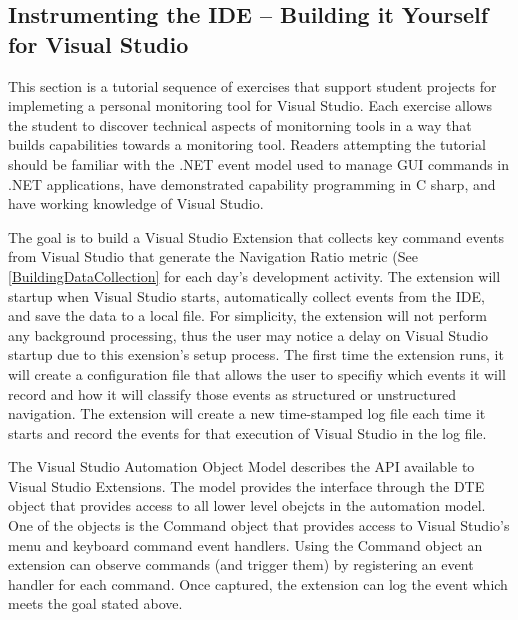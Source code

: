 
\subsection{Instrumenting the IDE -- Building it Yourself for Visual Studio} 
\label{buildItYourself}

This section is a tutorial sequence of exercises that support student projects for implemeting a personal monitoring tool for Visual Studio.  Each exercise allows the student to discover technical aspects of monitorning tools in a way that builds capabilities towards a monitoring tool.  Readers attempting the tutorial should be familiar with the .NET event model used to manage GUI commands in .NET applications, have demonstrated capability programming in C sharp, and have working knowledge of Visual Studio.  

The goal is to build a Visual Studio Extension that collects key command events from Visual Studio that generate the Navigation Ratio metric (See \ref{BuildingDataCollection} for each day's development activity.  The extension will startup when Visual Studio starts, automatically collect events from the IDE, and save the data to a local file.  For simplicity, the extension will not perform any background processing, thus the user may notice a delay on Visual Studio startup due to this exension's setup process.  The first time the extension runs, it will create a configuration file that allows the user to specifiy which events it will record and how it will classify those events as structured or unstructured navigation.  The extension will create a new time-stamped log file each time it starts and record the events for that execution of Visual Studio in the log file. 

The Visual Studio Automation Object Model describes the API available to Visual Studio Extensions.  The model provides the interface through the DTE object that provides access to all lower level obejcts in the automation model.  One of the objects is the Command object that provides access to Visual Studio's menu and keyboard command event handlers.  Using the Command object an extension can observe commands (and trigger them) by registering an event handler for each command.  Once captured, the extension can log the event which meets the goal stated above.

